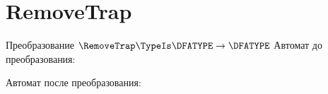 \section{RemoveTrap}
\begin{frame}{Преобразование $\RemoveTrap\TypeIs\DFATYPE\to\DFATYPE$}
	Автомат до преобразования:


	Автомат после преобразования:


\end{frame}
